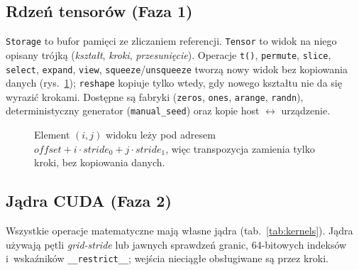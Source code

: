 \documentclass[11pt,a4paper]{article}
\begin{document}
\subsection{Rdzeń tensorów (Faza 1)}

\texttt{Storage} to bufor pamięci ze zliczaniem referencji. \texttt{Tensor} to widok na
niego opisany trójką (\emph{kształt}, \emph{kroki}, \emph{przesunięcie}). Operacje
\texttt{t()}, \texttt{permute}, \texttt{slice}, \texttt{select}, \texttt{expand},
\texttt{view}, \texttt{squeeze}/\texttt{unsqueeze} tworzą nowy widok bez kopiowania
danych (rys.~\ref{fig:strides}); \texttt{reshape} kopiuje tylko wtedy, gdy nowego kształtu
nie da się wyrazić krokami. Dostępne są fabryki (\texttt{zeros}, \texttt{ones},
\texttt{arange}, \texttt{randn}), deterministyczny generator (\texttt{manual\_seed})
oraz kopie host $\leftrightarrow$ urządzenie.

\begin{figure}[H]
\centering
{}
\caption{Element $(i,j)$ widoku leży pod adresem
  $\textit{offset} + i\cdot\textit{stride}_0 + j\cdot\textit{stride}_1$, więc transpozycja
  zamienia tylko kroki, bez kopiowania danych.}
\label{fig:strides}
\end{figure}

\subsection{Jądra CUDA (Faza 2)}

Wszystkie operacje matematyczne mają własne jądra (tab.~\ref{tab:kernels}). Jądra używają
pętli \emph{grid-stride} lub jawnych sprawdzeń granic, 64-bitowych indeksów i~wskaźników
\texttt{\_\_restrict\_\_}; wejścia nieciągłe obsługiwane są przez kroki.
\end{document}
